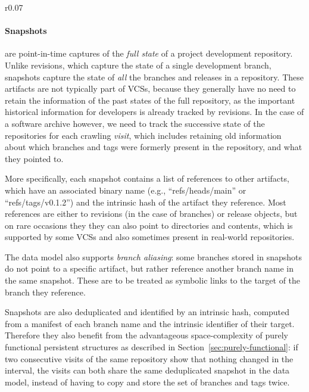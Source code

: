 \begin{wrapfigure}{r}{0.07\textwidth}\centering
{}
\end{wrapfigure}
\paragraph{\textbf{Snapshots}} are point-in-time captures of the \emph{full
state} of a project development repository. Unlike revisions, which capture the
state of a single development branch, snapshots capture the state of \emph{all}
the branches and releases in a repository. These artifacts are not typically
part of \glspl{VCS}, because they generally have no need to retain the
information of the past states of the full repository, as the important
historical information for developers is already tracked by revisions. In the
case of a software archive however, we need to track the successive state of
the repositories for each crawling \emph{visit}, which includes retaining old
information about which branches and tags were formerly present in the
repository, and what they pointed to.

More specifically, each snapshot contains a list of references to other
artifacts, which have an associated binary name (e.g., ``refs/heads/main'' or
``refs/tags/v0.1.2'') and the intrinsic hash of the artifact they reference.
Most references are either to revisions (in the case of branches) or release
objects, but on rare occasions they they can also point to directories and
contents, which is supported by some \glspl{VCS} and also sometimes present in
real-world repositories.

The data model also supports \emph{branch aliasing}: some branches stored in
snapshots do not point to a specific artifact, but rather reference another
branch name in the same snapshot. These are to be treated as symbolic links to
the target of the branch they reference.

Snapshots are also deduplicated and identified by an intrinsic hash, computed
from a manifest of each branch name and the intrinsic identifier of their
target. Therefore they also benefit from the advantageous space-complexity of
purely functional persistent structures as described in
Section~\ref{sec:purely-functional}: if two consecutive visits of the same
repository show that nothing changed in the interval, the visits can both share
the same deduplicated snapshot in the data model, instead of having to copy and
store the set of branches and tags twice.



